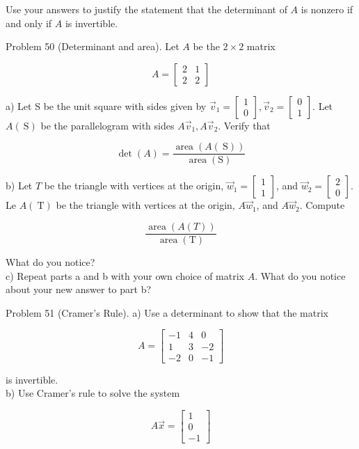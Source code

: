 \documentclass[10pt]{article}
\begin{document}
Use your answers to justify the statement that the determinant of $A$ is nonzero if and only if $A$ is invertible.

Problem 50 (Determinant and area). Let $A$ be the $2 \times 2$ matrix

$$
A=\left[\begin{array}{ll}
2 & 1 \\
2 & 2
\end{array}\right]
$$

a) Let S be the unit square with sides given by $\vec{v}_{1}=\left[\begin{array}{l}1 \\ 0\end{array}\right], \vec{v}_{2}=\left[\begin{array}{l}0 \\ 1\end{array}\right]$. Let $A(\mathrm{~S})$ be the parallelogram with sides $A \vec{v}_{1}, A \vec{v}_{2}$. Verify that

$$
\operatorname{det}(A)=\frac{\operatorname{area}(A(\mathrm{~S}))}{\operatorname{area}(\mathrm{S})}
$$

b) Let $T$ be the triangle with vertices at the origin, $\vec{w}_{1}=\left[\begin{array}{l}1 \\ 1\end{array}\right]$, and $\vec{w}_{2}=\left[\begin{array}{l}2 \\ 0\end{array}\right]$. Le $A(\mathrm{~T})$ be the triangle with vertices at the origin, $A \vec{w}_{1}$, and $A \vec{w}_{2}$. Compute

$$
\frac{\operatorname{area}(A(T))}{\operatorname{area}(\mathrm{T})}
$$

What do you notice?\\
c) Repeat parts a and b with your own choice of matrix $A$. What do you notice about your new answer to part b?

Problem 51 (Cramer's Rule). a) Use a determinant to show that the matrix

$$
A=\left[\begin{array}{ccc}
-1 & 4 & 0 \\
1 & 3 & -2 \\
-2 & 0 & -1
\end{array}\right]
$$

is invertible.\\
b) Use Cramer's rule to solve the system

$$
A \vec{x}=\left[\begin{array}{c}
1 \\
0 \\
-1
\end{array}\right]
$$
\end{document}
